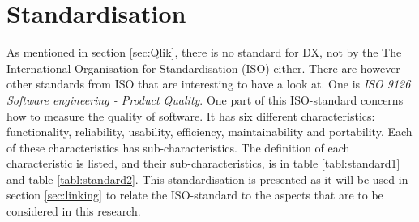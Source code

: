 \documentclass{cslthse-msc}
\begin{document}
    \section{Standardisation}
    As mentioned in section \ref{sec:Qlik}, there is no standard for DX, not by the The International Organisation for Standardisation (ISO) either. There are however other standards from ISO
    that are interesting to have a look at. One is \textit{ISO 9126 Software engineering - Product Quality}.
    One part of this ISO-standard concerns how to measure the quality of software.
    It has six different characteristics: functionality, reliability, usability, efficiency, maintainability and
    portability. Each of these characteristics has sub-characteristics. The definition of each
    characteristic is listed, and their sub-characteristics, is in table \ref{tabl:standard1} and table \ref{tabl:standard2}. This standardisation is presented as it will be used in section \ref{sec:linking} to relate the ISO-standard to the aspects that are to be considered in this research.
\end{document}
